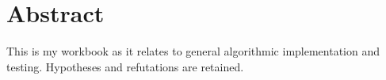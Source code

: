 \chapter*{Abstract}

This is my workbook as it relates to general algorithmic implementation and testing. Hypotheses and
refutations are retained.

\cleardoublepage
